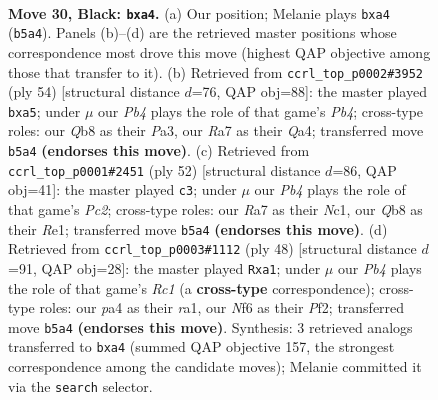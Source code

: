 \documentclass[11pt]{article}
\begin{document}
\clearpage

\begin{figure}[p]\centering
\begin{subfigure}{0.46\textwidth}\centering
\resizebox{\linewidth}{!}{%
\newchessgame
\chessboard[
  setfen={1qb5/r4pkp/5np1/1p4N1/Pp6/1P4P1/3NRPBP/R5K1 b - - 1 30},
  showmover=false,
  pgfstyle=straightmove, color=movearrow, markmove={b5-a4}
]}
\caption{}
\end{subfigure}\hfill
\begin{subfigure}{0.46\textwidth}\centering
\resizebox{\linewidth}{!}{%
\newchessgame
\chessboard[
  setfen={1r6/3kp2p/r1p2pp1/p2n4/QP1P4/P6P/3B1PP1/6K1 w - - 1 28},
  showmover=false,
  pgfstyle=straightmove, color=movearrow, markmove={b4-a5}
]}
\caption{}
\end{subfigure}
\\[4pt]
\begin{subfigure}{0.46\textwidth}\centering
\resizebox{\linewidth}{!}{%
\newchessgame
\chessboard[
  setfen={3q2k1/3r3p/p5p1/1p3r2/1n3PQ1/1P1p4/1PPR3P/1KN1R3 w - - 0 27},
  showmover=false,
  pgfstyle=straightmove, color=movearrow, markmove={c2-c3}
]}
\caption{}
\end{subfigure}\hfill
\begin{subfigure}{0.46\textwidth}\centering
\resizebox{\linewidth}{!}{%
\newchessgame
\chessboard[
  setfen={5rk1/1q2bpp1/4p2p/1p1p4/3PnB2/1Q3NPP/1P2PPK1/r1R5 w - - 0 25},
  showmover=false,
  pgfstyle=straightmove, color=movearrow, markmove={c1-a1}
]}
\caption{}
\end{subfigure}
\caption{\textbf{Move 30, Black: \texttt{bxa4}.} (a) Our position; Melanie plays \texttt{bxa4} (\texttt{b5a4}). Panels (b)--(d) are the retrieved master positions whose correspondence most drove this move (highest QAP objective among those that transfer to it). (b) Retrieved from \texttt{ccrl\_top\_p0002\#3952} (ply 54) [structural distance $d$=76, QAP obj=88]: the master played \texttt{bxa5}; under $\mu$ our \emph{Pb4} plays the role of that game's \emph{Pb4}; cross-type roles: our \emph{Q}b8 as their \emph{P}a3, our \emph{R}a7 as their \emph{Q}a4; transferred move \texttt{b5a4} \textbf{(endorses this move)}. (c) Retrieved from \texttt{ccrl\_top\_p0001\#2451} (ply 52) [structural distance $d$=86, QAP obj=41]: the master played \texttt{c3}; under $\mu$ our \emph{Pb4} plays the role of that game's \emph{Pc2}; cross-type roles: our \emph{R}a7 as their \emph{N}c1, our \emph{Q}b8 as their \emph{R}e1; transferred move \texttt{b5a4} \textbf{(endorses this move)}. (d) Retrieved from \texttt{ccrl\_top\_p0003\#1112} (ply 48) [structural distance $d$=91, QAP obj=28]: the master played \texttt{Rxa1}; under $\mu$ our \emph{Pb4} plays the role of that game's \emph{Rc1} (a \textbf{cross-type} correspondence); cross-type roles: our \emph{p}a4 as their \emph{r}a1, our \emph{N}f6 as their \emph{P}f2; transferred move \texttt{b5a4} \textbf{(endorses this move)}. Synthesis: 3 retrieved analogs transferred to \texttt{bxa4} (summed QAP objective 157, the strongest correspondence among the candidate moves); Melanie committed it via the \texttt{search} selector.}
\label{fig:thought-m59}
\end{figure}
\end{document}
